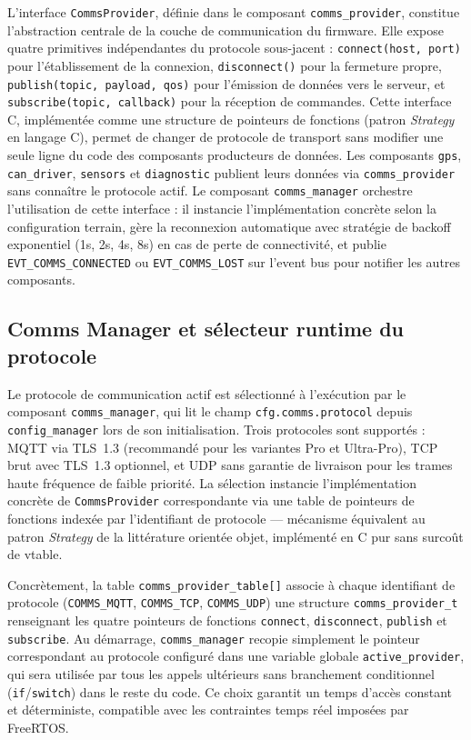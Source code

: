 L'interface \texttt{CommsProvider}, définie dans le composant
\texttt{comms\_provider}, constitue l'abstraction centrale de la
couche de communication du firmware. Elle expose quatre primitives
indépendantes du protocole sous-jacent : \texttt{connect(host, port)}
pour l'établissement de la connexion, \texttt{disconnect()} pour
la fermeture propre, \texttt{publish(topic, payload, qos)} pour
l'émission de données vers le serveur, et \texttt{subscribe(topic, callback)}
pour la réception de commandes. Cette interface C, implémentée comme
une structure de pointeurs de fonctions (patron \textit{Strategy}
en langage C), permet de changer de protocole de transport sans
modifier une seule ligne du code des composants producteurs de données.
Les composants \texttt{gps}, \texttt{can\_driver}, \texttt{sensors}
et \texttt{diagnostic} publient leurs données via \texttt{comms\_provider}
sans connaître le protocole actif. Le composant \texttt{comms\_manager}
orchestre l'utilisation de cette interface : il instancie
l'implémentation concrète selon la configuration terrain, gère la
reconnexion automatique avec stratégie de backoff exponentiel (1s,
2s, 4s, 8s) en cas de perte de connectivité, et publie
\texttt{EVT\_COMMS\_CONNECTED} ou \texttt{EVT\_COMMS\_LOST} sur
l'event bus pour notifier les autres composants.

\subsection{Comms Manager et sélecteur runtime du protocole}
\label{subsec:comms_sel}

Le protocole de communication actif est sélectionné à l'exécution
par le composant \texttt{comms\_manager}, qui lit le champ
\texttt{cfg.comms.protocol} depuis \texttt{config\_manager} lors de
son initialisation. Trois protocoles sont supportés : MQTT via
TLS~1.3 (recommandé pour les variantes Pro et Ultra-Pro), TCP brut
avec TLS~1.3 optionnel, et UDP sans garantie de livraison pour les
trames haute fréquence de faible priorité. La sélection instancie
l'implémentation concrète de \texttt{CommsProvider} correspondante
via une table de pointeurs de fonctions indexée par l'identifiant
de protocole — mécanisme équivalent au patron \textit{Strategy}
de la littérature orientée objet, implémenté en C pur sans surcoût
de vtable.

Concrètement, la table \texttt{comms\_provider\_table[]} associe à
chaque identifiant de protocole (\texttt{COMMS\_MQTT},
\texttt{COMMS\_TCP}, \texttt{COMMS\_UDP}) une structure
\texttt{comms\_provider\_t} renseignant les quatre pointeurs de
fonctions \texttt{connect}, \texttt{disconnect}, \texttt{publish} et
\texttt{subscribe}. Au démarrage, \texttt{comms\_manager} recopie
simplement le pointeur correspondant au protocole configuré dans une
variable globale \texttt{active\_provider}, qui sera utilisée par
tous les appels ultérieurs sans branchement conditionnel
(\texttt{if}/\texttt{switch}) dans le reste du code. Ce choix garantit
un temps d'accès constant et déterministe, compatible avec les
contraintes temps réel imposées par FreeRTOS.

